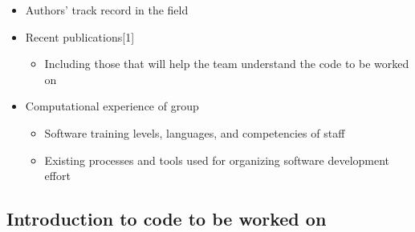 \documentclass[]{scrartcl}
\begin{document}
\begin{itemize}
\itemsep1pt\parskip0pt
\item
  Authors' track record in the field
\item
  Recent publications{[}1{]}

  \begin{itemize}
  \itemsep1pt\parskip0pt
  \item
    Including those that will help the team understand the code to be
    worked on
  \end{itemize}
\item
  Computational experience of group

  \begin{itemize}
  \itemsep1pt\parskip0pt
  \item
    Software training levels, languages, and competencies of staff
  \item
    Existing processes and tools used for organizing software
    development effort
  \end{itemize}
\end{itemize}

\subsection{Introduction to code to be worked
on}\label{introduction-to-code-to-be-worked-on}
\end{document}
